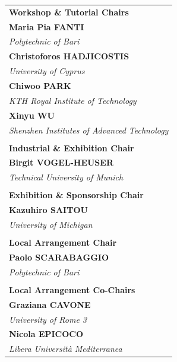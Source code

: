 \documentclass[
	openany, %
	parskip=full, %
	12pt, %
	a4paper, %
]{conferencebooklet} %
\begin{document}
\begin{table}[h!]
{\begin{tabular}{p{75mm}}
            \large \textbf{Workshop \& Tutorial Chairs} \\
            \textbf{Maria Pia FANTI} \\
            \textit{Polytechnic of Bari} \vspace{2mm} \\
            \textbf{Christoforos HADJICOSTIS} \\
            \textit{University of Cyprus} \vspace{2mm} \\
            \textbf{Chiwoo PARK} \\
            \textit{KTH Royal Institute of Technology} \vspace{2mm} \\
            \textbf{Xinyu WU} \\ 
            \textit{Shenzhen Institutes of Advanced Technology} \\ \\
            \large \textbf{Industrial \& Exhibition Chair} \\
            \textbf{Birgit VOGEL-HEUSER} \\ 
            \textit{Technical University of Munich} \\ \\
            \large \textbf{Exhibition \& Sponsorship Chair} \\
            \textbf{Kazuhiro SAITOU} \\ 
            \textit{University of Michigan} \\ \\
            \large \textbf{Local Arrangement Chair} \\
            \textbf{Paolo SCARABAGGIO} \\
            \textit{Polytechnic of Bari} \vspace{2mm} \\ \\
            \large \textbf{Local Arrangement Co-Chairs} \\
            \textbf{Graziana CAVONE} \\
            \textit{University of Rome 3} \vspace{2mm} \\
            \textbf{Nicola EPICOCO} \\
            \textit{Libera Università Mediterranea} \vspace{8 mm}
        \end{tabular}
    }
\end{table}
\end{document}
